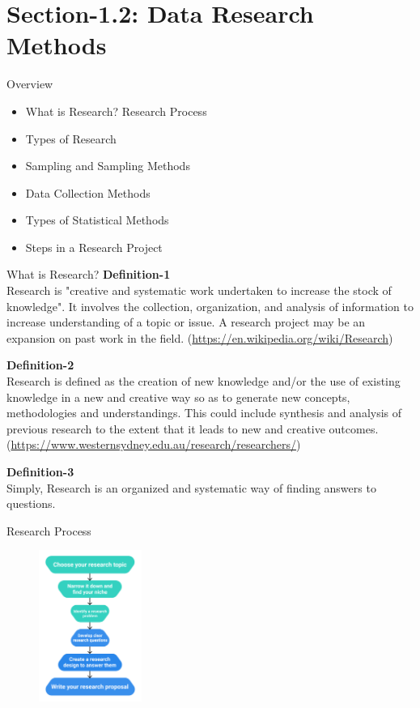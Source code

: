 

\maketitle
\section{Section-1.2: Data Research Methods}
\begin{frame}[t]{Overview}
	\begin{itemize}
		\item What is Research? Research Process
		\item Types of Research 
		\item Sampling and Sampling Methods
		\item Data Collection Methods 
		\item Types of Statistical Methods
		\item Steps in a Research Project
	\end{itemize}
\end{frame}
\begin{frame}[t]{What is Research?}
	\textbf{Definition-1} \\ 
	Research is "creative and systematic work undertaken to increase the stock 
	of knowledge". It involves the collection, organization, and analysis of 
	information to increase understanding of a topic or issue. A research 
	project may be an expansion on past work in the field.
	(\url{https://en.wikipedia.org/wiki/Research})
	
	\textbf{Definition-2} \\ 
	Research is defined as the creation of new knowledge and/or the use of 
	existing knowledge in a new and creative way so as to generate new 
	concepts, methodologies and understandings. This could include synthesis 
	and analysis of previous research to the extent that it leads to new and 
	creative outcomes.
	(\url{https://www.westernsydney.edu.au/research/researchers/})
	
	\textbf{Definition-3} \\
	Simply, Research is an organized and systematic way of finding answers to 
	questions.
\end{frame}
\begin{frame}[t]{Research Process}
	\begin{figure} [ht]
		\centering
		\includegraphics[width=0.3\textwidth]{rp/rp.png}
	\end{figure}
\end{frame}


